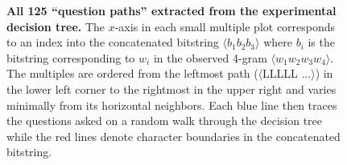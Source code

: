 \documentclass[12pt]{article}
\begin{document}
\begin{figure}
  \centering
  \vspace{-1in}
  \caption{\textbf{All 125 ``question paths'' extracted from the
      experimental decision tree.} The $x$-axis in each small multiple
    plot corresponds to an index into the concatenated bitstring
    $\langle b_1 b_2 b_3 \rangle$ where $b_i$ is the bitstring
    corresponding to $w_i$ in the observed 4-gram $\langle w_1 w_2 w_3
    w_4 \rangle$. The multiples are ordered from the leftmost path
    ($\langle$LLLLL $...\rangle$) in the lower left corner to the
    rightmost in the upper right and varies minimally from its
    horizontal neighbors. Each blue line then traces the questions
    asked on a random walk through the decision tree while the red
    lines denote character boundaries in the concatenated bitstring.}
  \label{fig:bs_examplepaths}
\end{figure}

\end{document}
